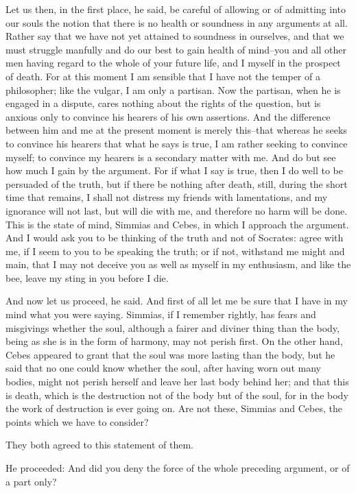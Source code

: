 Let us then, in the first place, he said, be careful of allowing or of
admitting into our souls the notion that there is no health or soundness
in any arguments at all. Rather say that we have not yet attained to
soundness in ourselves, and that we must struggle manfully and do our
best to gain health of mind--you and all other men having regard to the
whole of your future life, and I myself in the prospect of death. For at
this moment I am sensible that I have not the temper of a philosopher;
like the vulgar, I am only a partisan. Now the partisan, when he is
engaged in a dispute, cares nothing about the rights of the question,
but is anxious only to convince his hearers of his own assertions.
And the difference between him and me at the present moment is merely
this--that whereas he seeks to convince his hearers that what he says is
true, I am rather seeking to convince myself; to convince my hearers
is a secondary matter with me. And do but see how much I gain by the
argument. For if what I say is true, then I do well to be persuaded of
the truth, but if there be nothing after death, still, during the short
time that remains, I shall not distress my friends with lamentations,
and my ignorance will not last, but will die with me, and therefore
no harm will be done. This is the state of mind, Simmias and Cebes, in
which I approach the argument. And I would ask you to be thinking of
the truth and not of Socrates: agree with me, if I seem to you to be
speaking the truth; or if not, withstand me might and main, that I may
not deceive you as well as myself in my enthusiasm, and like the bee,
leave my sting in you before I die.

And now let us proceed, he said. And first of all let me be sure that
I have in my mind what you were saying. Simmias, if I remember rightly,
has fears and misgivings whether the soul, although a fairer and diviner
thing than the body, being as she is in the form of harmony, may not
perish first. On the other hand, Cebes appeared to grant that the soul
was more lasting than the body, but he said that no one could know
whether the soul, after having worn out many bodies, might not perish
herself and leave her last body behind her; and that this is death,
which is the destruction not of the body but of the soul, for in the
body the work of destruction is ever going on. Are not these, Simmias
and Cebes, the points which we have to consider?

They both agreed to this statement of them.

He proceeded: And did you deny the force of the whole preceding
argument, or of a part only?

